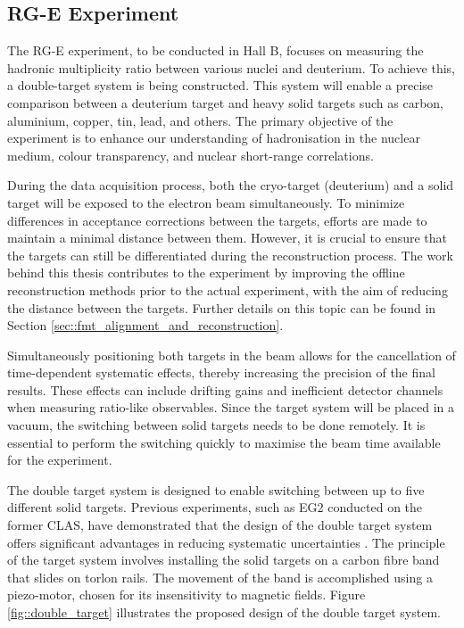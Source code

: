 \subsection{RG-E Experiment}
\label{11.300::rge_experiment}
    The RG-E experiment, to be conducted in Hall B, focuses on measuring the hadronic multiplicity ratio between various nuclei and deuterium.
    To achieve this, a double-target system is being constructed.
    This system will enable a precise comparison between a deuterium target and heavy solid targets such as carbon, aluminium, copper, tin, lead, and others.
    The primary objective of the experiment is to enhance our understanding of hadronisation in the nuclear medium, colour transparency, and nuclear short-range correlations.

    During the data acquisition process, both the cryo-target (deuterium) and a solid target will be exposed to the electron beam simultaneously.
    To minimize differences in acceptance corrections between the targets, efforts are made to maintain a minimal distance between them.
    However, it is crucial to ensure that the targets can still be differentiated during the reconstruction process.
    The work behind this thesis contributes to the experiment by improving the offline reconstruction methods prior to the actual experiment, with the aim of reducing the distance between the targets.
    Further details on this topic can be found in Section \ref{sec::fmt_alignment_and_reconstruction}.

    Simultaneously positioning both targets in the beam allows for the cancellation of time-dependent systematic effects, thereby increasing the precision of the final results.
    These effects can include drifting gains and inefficient detector channels when measuring ratio-like observables.
    Since the target system will be placed in a vacuum, the switching between solid targets needs to be done remotely.
    It is essential to perform the switching quickly to maximise the beam time available for the experiment.

    The double target system is designed to enable switching between up to five different solid targets.
    Previous experiments, such as EG2 conducted on the former CLAS, have demonstrated that the design of the double target system offers significant advantages in reducing systematic uncertainties \cite{hakobyan2008}.
    The principle of the target system involves installing the solid targets on a carbon fibre band that slides on torlon rails.
    The movement of the band is accomplished using a piezo-motor, chosen for its insensitivity to magnetic fields.
    Figure \ref{fig::double_target} illustrates the proposed design of the double target system.

